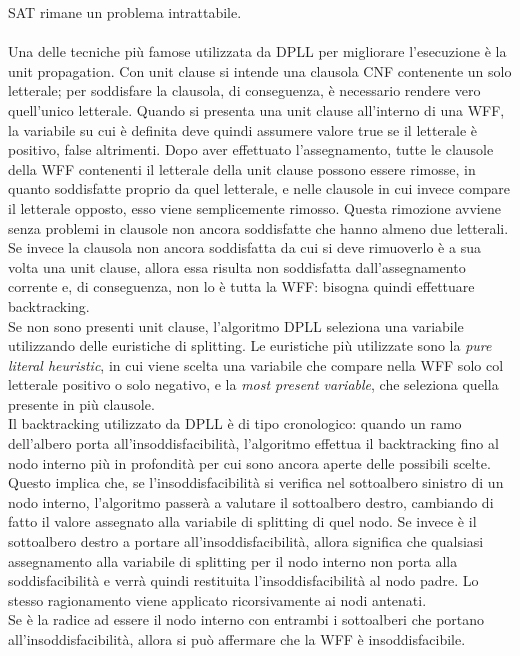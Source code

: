 SAT rimane un problema intrattabile.\\
\\
Una delle tecniche più famose utilizzata da DPLL per migliorare l'esecuzione è la unit propagation.
Con unit clause si intende una clausola CNF contenente un solo letterale; per soddisfare la clausola, di conseguenza, è necessario
rendere vero quell'unico letterale.
Quando si presenta una unit clause all'interno di una WFF, la variabile su cui è definita deve quindi assumere valore
true se il letterale è positivo, false altrimenti.
Dopo aver effettuato l'assegnamento, tutte le clausole della WFF contenenti il letterale della unit clause possono essere rimosse,
in quanto soddisfatte proprio da quel letterale, e nelle clausole in cui invece compare il letterale opposto, esso viene semplicemente
rimosso.
Questa rimozione avviene senza problemi in clausole non ancora soddisfatte che hanno almeno due letterali. Se invece la clausola non
ancora soddisfatta da cui si deve rimuoverlo è a sua volta una unit clause, allora essa risulta non soddisfatta dall'assegnamento
corrente e, di conseguenza, non lo è tutta la WFF: bisogna quindi effettuare backtracking.\\
Se non sono presenti unit clause, l'algoritmo DPLL seleziona una variabile utilizzando delle euristiche di splitting.
Le euristiche più utilizzate sono la \textit{pure literal heuristic}, in cui viene scelta una variabile che compare nella WFF
solo col letterale positivo o solo negativo, e la \textit{most present variable}, che seleziona quella presente in più clausole.\\
Il backtracking utilizzato da DPLL è di tipo cronologico: quando un ramo dell'albero porta all'insoddisfacibilità, l'algoritmo 
effettua il backtracking fino al nodo interno più in profondità per cui sono ancora aperte delle possibili scelte.
Questo implica che, se l'insoddisfacibilità si verifica nel sottoalbero sinistro di un nodo interno, l'algoritmo passerà
a valutare il sottoalbero destro, cambiando di fatto il valore assegnato alla variabile di splitting di quel nodo.
Se invece è il sottoalbero destro a portare all'insoddisfacibilità, allora significa che qualsiasi assegnamento alla
variabile di splitting per il nodo interno non porta alla soddisfacibilità e verrà quindi restituita l'insoddisfacibilità
al nodo padre.
Lo stesso ragionamento viene applicato ricorsivamente ai nodi antenati.\\
Se è la radice ad essere il nodo interno con entrambi i sottoalberi che portano all'insoddisfacibilità, allora si può affermare 
che la WFF è insoddisfacibile.


